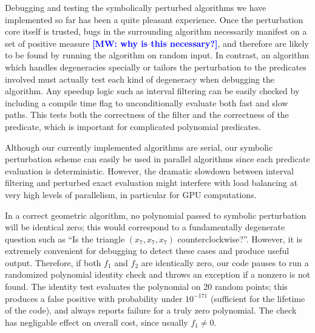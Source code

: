\documentclass[11pt]{article}
\newcommand{\MW}[1]{\textcolor{blue}{\bf[MW: #1]}}
\begin{document}
Debugging and testing the symbolically perturbed algorithms we have implemented so far has been a quite pleasant experience.  Once the perturbation core itself is trusted,
bugs in the surrounding algorithm necessarily manifest on a set of positive measure \MW{why is this necessary?}, and therefore are likely to be found by running the algorithm on random input.  In contrast, an
algorithm which handles degeneracies specially or tailors the perturbation to the predicates involved must actually test each kind of degeneracy when debugging the algorithm.
Any speedup logic such as interval filtering can be easily checked by including a compile time flag to unconditionally evaluate both fast and slow paths.  This tests both the
correctness of the filter and the correctness of the predicate, which is important for complicated polynomial predicates.

Although our currently implemented algorithms are serial, our symbolic perturbation scheme can easily be used in parallel algorithms since each predicate evaluation is deterministic.
However, the dramatic slowdown between interval filtering and perturbed exact evaluation might interfere with load balancing at very high levels of parallelism, in particular for
GPU computations.

In a correct geometric algorithm, no polynomial passed to symbolic perturbation will be identical zero; this would correspond to a fundamentally degenerate question such as
``Is the triangle $(x_7,x_7,x_7)$ counterclockwise?''.  However, it is extremely convenient for debugging to detect these cases and produce useful output.  Therefore,
if both $f_1$ and $f_2$ are identically zero, our code pauses to run a randomized polynomial identity check \cite{schwartz1980fast} and throws an exception if a nonzero is not found.
The identity test evaluates the polynomial on 20 random points; this produces a false positive with probability under $10^{-171}$ (sufficient for the
lifetime of the code), and always reports failure for a truly zero polynomial.  The check has negligable effect on overall cost, since usually $f_1 \ne 0$.
\end{document}
